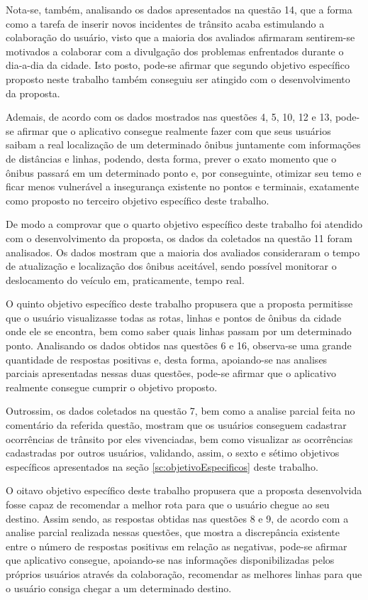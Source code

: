 Nota-se, também, analisando os dados apresentados na questão 14, que a forma como a tarefa de inserir novos incidentes de trânsito acaba estimulando a colaboração do usuário, visto que a maioria dos avaliados afirmaram sentirem-se motivados a colaborar com a divulgação dos problemas enfrentados durante o dia-a-dia da cidade. Isto posto, pode-se afirmar que segundo objetivo específico proposto neste trabalho também conseguiu ser atingido com o desenvolvimento da proposta.
	
Ademais, de acordo com os dados mostrados nas questões 4, 5, 10, 12 e 13, pode-se afirmar que o aplicativo consegue realmente fazer com que seus usuários saibam a real localização de um determinado ônibus juntamente com informações de distâncias e linhas, podendo, desta forma, prever o exato momento que o ônibus passará em um determinado ponto e, por conseguinte, otimizar seu temo e ficar menos vulnerável a insegurança existente no pontos e terminais, exatamente como proposto no terceiro objetivo específico deste trabalho. 

De modo a comprovar que o quarto objetivo específico deste trabalho foi atendido com o desenvolvimento da proposta, os dados da coletados na questão 11 foram analisados. Os dados mostram que a maioria dos avaliados consideraram o tempo de atualização e localização dos ônibus aceitável, sendo possível monitorar o deslocamento do veículo em, praticamente, tempo real.
	
O quinto objetivo específico deste trabalho propusera que a proposta permitisse que o usuário visualizasse todas as rotas, linhas e pontos de ônibus da cidade onde ele se encontra, bem como saber quais linhas passam por um determinado ponto. Analisando os dados obtidos nas questões 6 e 16, observa-se uma grande quantidade de respostas positivas e, desta forma, apoiando-se nas analises parciais apresentadas nessas duas questões, pode-se afirmar que o aplicativo realmente consegue cumprir o objetivo proposto.
	
Outrossim, os dados coletados na questão 7, bem como a analise parcial feita no comentário da referida questão, mostram que os usuários conseguem cadastrar ocorrências de trânsito por eles vivenciadas, bem como visualizar as ocorrências cadastradas por outros usuários, validando, assim, o sexto e sétimo objetivos específicos apresentados na seção \ref{sc:objetivoEspecificos} deste trabalho.  
	
O oitavo objetivo específico deste trabalho propusera que a proposta desenvolvida fosse capaz de recomendar a melhor rota para que o usuário chegue ao seu destino. Assim sendo, as respostas obtidas nas questões 8 e 9, de acordo com a analise parcial realizada nessas questões, que mostra a discrepância existente entre o número de respostas positivas em relação as negativas, pode-se afirmar que aplicativo consegue, apoiando-se nas informações disponibilizadas pelos próprios usuários através da colaboração, recomendar as melhores linhas para que o usuário consiga chegar a um determinado destino.

	






